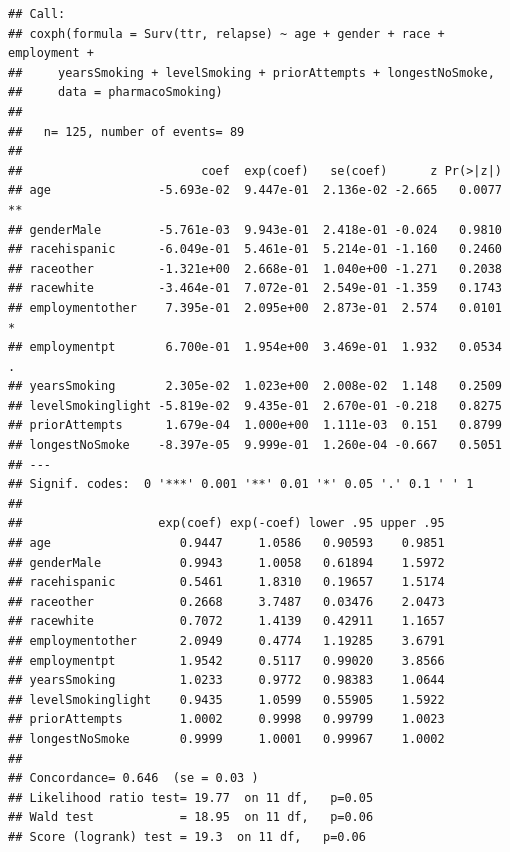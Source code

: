 \documentclass[
]{article}
\begin{document}
\begin{verbatim}
## Call:
## coxph(formula = Surv(ttr, relapse) ~ age + gender + race + employment + 
##     yearsSmoking + levelSmoking + priorAttempts + longestNoSmoke, 
##     data = pharmacoSmoking)
## 
##   n= 125, number of events= 89 
## 
##                         coef  exp(coef)   se(coef)      z Pr(>|z|)   
## age               -5.693e-02  9.447e-01  2.136e-02 -2.665   0.0077 **
## genderMale        -5.761e-03  9.943e-01  2.418e-01 -0.024   0.9810   
## racehispanic      -6.049e-01  5.461e-01  5.214e-01 -1.160   0.2460   
## raceother         -1.321e+00  2.668e-01  1.040e+00 -1.271   0.2038   
## racewhite         -3.464e-01  7.072e-01  2.549e-01 -1.359   0.1743   
## employmentother    7.395e-01  2.095e+00  2.873e-01  2.574   0.0101 * 
## employmentpt       6.700e-01  1.954e+00  3.469e-01  1.932   0.0534 . 
## yearsSmoking       2.305e-02  1.023e+00  2.008e-02  1.148   0.2509   
## levelSmokinglight -5.819e-02  9.435e-01  2.670e-01 -0.218   0.8275   
## priorAttempts      1.679e-04  1.000e+00  1.111e-03  0.151   0.8799   
## longestNoSmoke    -8.397e-05  9.999e-01  1.260e-04 -0.667   0.5051   
## ---
## Signif. codes:  0 '***' 0.001 '**' 0.01 '*' 0.05 '.' 0.1 ' ' 1
## 
##                   exp(coef) exp(-coef) lower .95 upper .95
## age                  0.9447     1.0586   0.90593    0.9851
## genderMale           0.9943     1.0058   0.61894    1.5972
## racehispanic         0.5461     1.8310   0.19657    1.5174
## raceother            0.2668     3.7487   0.03476    2.0473
## racewhite            0.7072     1.4139   0.42911    1.1657
## employmentother      2.0949     0.4774   1.19285    3.6791
## employmentpt         1.9542     0.5117   0.99020    3.8566
## yearsSmoking         1.0233     0.9772   0.98383    1.0644
## levelSmokinglight    0.9435     1.0599   0.55905    1.5922
## priorAttempts        1.0002     0.9998   0.99799    1.0023
## longestNoSmoke       0.9999     1.0001   0.99967    1.0002
## 
## Concordance= 0.646  (se = 0.03 )
## Likelihood ratio test= 19.77  on 11 df,   p=0.05
## Wald test            = 18.95  on 11 df,   p=0.06
## Score (logrank) test = 19.3  on 11 df,   p=0.06
\end{verbatim}
\end{document}
